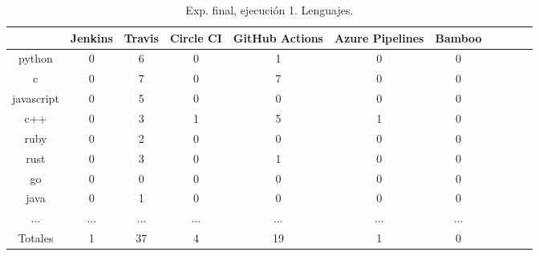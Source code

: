 \begin{table}
  \centering
  \caption{Exp. final, ejecución 1. Lenguajes.}
  \label{tab:tabla_f1_6a}

\begin{footnotesize}
\renewcommand{\arraystretch}{1.5} %
\begin{tabular}{ccccccccccc}
  \hline
  {} &  Jenkins &  Travis &  Circle CI &  GitHub Actions &  Azure Pipelines &  Bamboo \\
  \hline
  python           &        0 &       6 &          0 &               1 &                0 &       0 \\
  c                &        0 &       7 &          0 &               7 &                0 &       0 \\
  javascript       &        0 &       5 &          0 &               0 &                0 &       0 \\
  c++              &        0 &       3 &          1 &               5 &                1 &       0 \\
  ruby             &        0 &       2 &          0 &               0 &                0 &       0 \\
  rust             &        0 &       3 &          0 &               1 &                0 &       0 \\
  go               &        0 &       0 &          0 &               0 &                0 &       0 \\
  java             &        0 &       1 &          0 &               0 &                0 &       0 \\
  ...              &      ... &     ... &        ... &             ... &              ... &     ... \\
  \hline
  Totales          &        1 &      37 &          4 &              19 &                1 &       0 \\
 \end{tabular}
\end{footnotesize}

\end{table}

